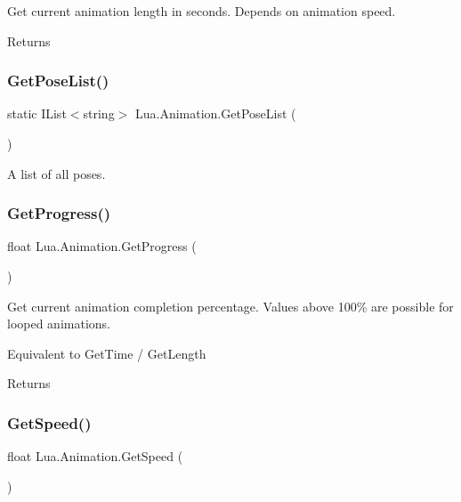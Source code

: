 Get current animation length in seconds. Depends on animation speed. 

\begin{DoxyReturn}{Returns}

\end{DoxyReturn}
\mbox{\label{class_lua_1_1_animation_aab1106afb022117d78df5cc01e426197}} 
\subsubsection{\texorpdfstring{GetPoseList()}{GetPoseList()}}
{\footnotesize\ttfamily static I\+List$<$string$>$ Lua.\+Animation.\+Get\+Pose\+List (\begin{DoxyParamCaption}{ }\end{DoxyParamCaption})\hspace{0.3cm}{\ttfamily [static]}}



A list of all poses. 

\mbox{\label{class_lua_1_1_animation_ae9196e188d96824f23cf65b1f835aa1a}} 
\subsubsection{\texorpdfstring{GetProgress()}{GetProgress()}}
{\footnotesize\ttfamily float Lua.\+Animation.\+Get\+Progress (\begin{DoxyParamCaption}{ }\end{DoxyParamCaption})}



Get current animation completion percentage. Values above 100\% are possible for looped animations. 

Equivalent to Get\+Time / Get\+Length \begin{DoxyReturn}{Returns}

\end{DoxyReturn}
\mbox{\label{class_lua_1_1_animation_ac615b08b06a84330cddb327e6d28f6c9}} 
\subsubsection{\texorpdfstring{GetSpeed()}{GetSpeed()}}
{\footnotesize\ttfamily float Lua.\+Animation.\+Get\+Speed (\begin{DoxyParamCaption}{ }\end{DoxyParamCaption})}




